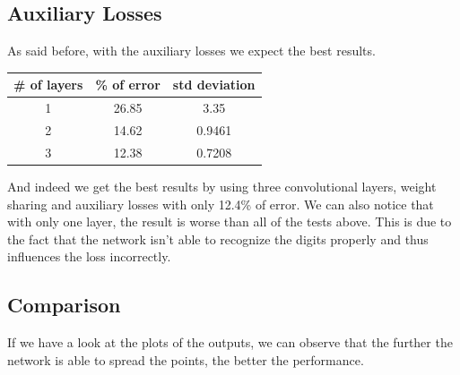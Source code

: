 \documentclass{article}
\begin{document}
\subsection{Auxiliary Losses}

As said before, with the auxiliary losses we expect the best results.

\begin{center}
\begin{tabular}{|c|c|c|}
\hline 
\# of layers & \% of error & std deviation \\ 
\hline 
1 & 26.85 & 3.35 \\ 
\hline 
2 & 14.62 & 0.9461 \\ 
\hline 
3 & 12.38 & 0.7208 \\ 
\hline 
\end{tabular}
\end{center}

And indeed we get the best results by using three convolutional layers, weight sharing and auxiliary losses with only 12.4\% of error. We can also notice that with only one layer, the result is worse than all of the tests above. This is due to the fact that the network isn't able to recognize the digits properly and thus influences the loss incorrectly.

\subsection{Comparison}

If we have a look at the plots of the outputs, we can observe that the further the network is able to spread the points, the better the performance. 
\end{document}
